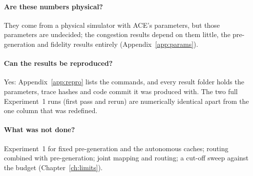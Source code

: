 \paragraph{Are these numbers physical?} They come from a physical simulator with ACE's parameters, but those parameters are undecided; the congestion results depend on them little, the pre-generation and fidelity results entirely (Appendix~\ref{app:params}).

\paragraph{Can the results be reproduced?} Yes: Appendix~\ref{app:repro} lists the commands, and every result folder holds the parameters, trace hashes and code commit it was produced with. The two full Experiment~1 runs (first pass and rerun) are numerically identical apart from the one column that was redefined.

\paragraph{What was not done?} Experiment~1 for fixed pre-generation and the autonomous caches; routing combined with pre-generation; joint mapping and routing; a cut-off sweep against the budget (Chapter~\ref{ch:limits}).
